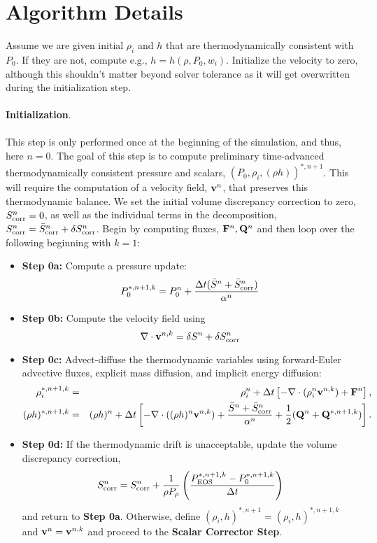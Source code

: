 \documentclass[final]{siamltex}
\def\Fb {{\bf F}}
\def\Qb {{\bf Q}}
\def\vb {{\bf v}}
\begin{document}
\section{Algorithm Details}
Assume we are given initial $\rho_i$ and $h$ that are thermodynamically consistent with 
$P_0$.  If they are not, compute e.g., $h = h(\rho,P_0,w_i)$.  Initialize the velocity
to zero, although this shouldn't matter beyond solver tolerance as it will get 
overwritten during the initialization step.\\ \\
{\bf Initialization}.\\ \\
This step is only performed once at the beginning of the simulation, and
thus, here $n=0$.
The goal of this step is to compute preliminary time-advanced thermodynamically
consistent pressure and scalars, $(P_0,\rho_i,(\rho h))^{*,n+1}$.  This will
require the computation of a velocity field, $\vb^n$, that preserves this
thermodynamic balance.  
We set the initial volume discrepancy correction to zero, 
$S_{\rm corr}^n = 0$, as well as the individual terms in the decomposition,
$S_{\rm corr}^n = \bar{S}_{\rm corr}^n + \delta S_{\rm corr}^n$.
Begin by computing fluxes, $\Fb^n, \Qb^n$ and then
loop over the following beginning with $k=1$:\\
\begin{itemize}
\item {\bf Step 0a:} Compute a pressure update:
\begin{equation}
P_0^{*,n+1,k} = P_0^n + \frac{\Delta t(\bar{S}^n + \bar{S}_{\rm corr}^n)}{\alpha^n}
\end{equation}
\item {\bf Step 0b:} Compute the velocity field using
\begin{equation}
\nabla\cdot\vb^{n,k} = \delta S^n + \delta S_{\rm corr}^n
\end{equation}
\item {\bf Step 0c:} Advect-diffuse the thermodynamic variables using forward-Euler advective fluxes,
explicit mass diffusion, and implicit energy diffusion:
\begin{eqnarray}
\rho_i^{*,n+1,k} &=& \rho_i^n + \Delta t\left[-\nabla\cdot(\rho_i^n\vb^{n,k}) + \Fb^n\right], \\
(\rho h)^{*,n+1,k} &=& (\rho h)^n + \Delta t\left[-\nabla\cdot((\rho h)^n\vb^{n,k}) + \frac{\bar{S}^n + \bar{S}_{\rm corr}^n}{\alpha^n} + \frac{1}{2}(\Qb^n + \Qb^{*,n+1,k})\right].\nonumber\\
\end{eqnarray}
\item {\bf Step 0d:} If the thermodynamic drift is unacceptable, update the volume 
discrepancy correction,
\begin{equation}
S_{\rm corr}^n = S_{\rm corr}^n + \frac{1}{\rho P_\rho}\left(\frac{P_{\rm EOS}^{*,n+1,k} - P_0^{*,n+1,k}}{\Delta t}\right)
\end{equation}
and return to {\bf Step 0a}.  Otherwise, define 
$(\rho_i,h)^{*,n+1} = (\rho_i,h)^{*,n+1,k}$ and $\vb^n = \vb^{n,k}$ and proceed to 
the {\bf Scalar Corrector Step}.\\
\end{itemize}
\end{document}

